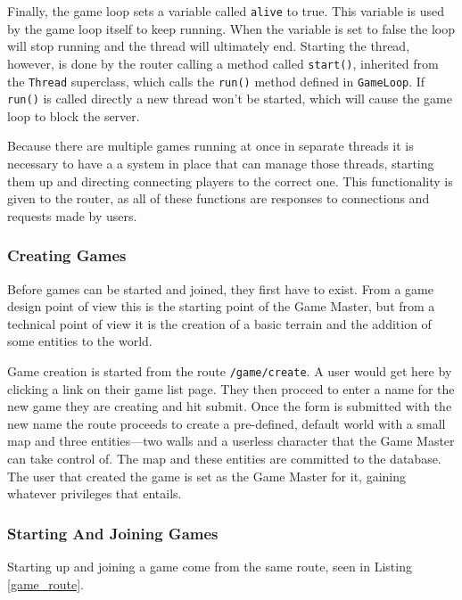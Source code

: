 Finally, the game loop sets a variable called \texttt{alive} to true. This variable is used by the game loop itself to keep running. When the variable is set to false the loop will stop running and the thread will ultimately end. Starting the thread, however, is done by the router calling a method called \texttt{start()}, inherited from the \texttt{Thread} superclass, which calls the \texttt{run()} method defined in \texttt{GameLoop}.  If \texttt{run()} is called directly a new thread won't be started, which will cause the game loop to block the server.

Because there are multiple games running at once in separate threads it is necessary to have a a system in place that can manage those threads, starting them up and directing connecting players to the correct one. This functionality is given to the router, as all of these functions are responses to connections and requests made by users.

\subsubsection{Creating Games}
Before games can be started and joined, they first have to exist. From a game design point of view this is the starting point of the Game Master, but from a technical point of view it is the creation of a basic terrain and the addition of some entities to the world.

Game creation is started from the route \texttt{/game/create}. A user would get here by clicking a link on their game list page. They then proceed to enter a name for the new game they are creating and hit submit. Once the form is submitted with the new name the route proceeds to create a pre-defined, default world with a small map and three entities---two walls and a userless character that the Game Master can take control of. The map and these entities are committed to the database. The user that created the game is set as the Game Master for it, gaining whatever privileges that entails.

\subsubsection{Starting And Joining Games}
Starting up and joining a game come from the same route, seen in Listing \ref{game_route}.

